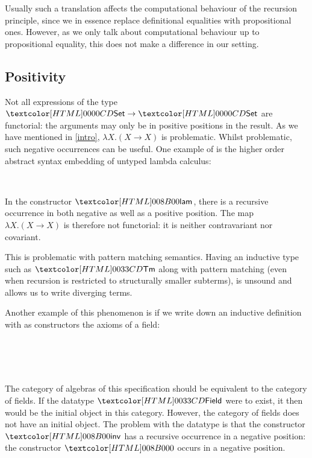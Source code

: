 Usually such a translation affects the computational behaviour of the
recursion principle, since we in essence replace definitional
equalities with propositional ones. However, as we only talk about
computational behaviour up to propositional equality, this does not
make a difference in our setting.

\subsection{Positivity}

Not all expressions of the type $\Set \to \Set$ are functorial: the
arguments may only be in positive positions in the result. As we have
mentioned in \cref{intro}, $\lambda X . (X \to X)$ is
problematic. Whilst problematic, such negative occurrences can be
useful. One example of is the higher order abstract syntax embedding
of untyped lambda calculus:
%
\begin{datatype}{\tttmty}{\Set}
  \constr{\ttapp}{\tttmty \to \tttmty \to \tttmty} \\
  \constr{\ttlam}{(\tttmty \to \tttmty) \to \tttmty}
\end{datatype}
%
In the constructor $\ttlam$, there is a recursive occurrence in both
negative as well as a positive position. The map
$\lambda X . (X \to X)$ is therefore not functorial: it is neither
contravariant nor covariant. 

This is problematic with pattern matching semantics. Having an
inductive type such as $\tttmty$ along with pattern matching (even
when recursion is restricted to structurally smaller subterms), is
unsound and allows us to write diverging terms.

Another example of this phenomenon is if we write down an inductive
definition with as constructors the axioms of a field:
%
\begin{datatype}{\fieldty}{\Set}
  \constr{\fieldzero}{\fieldty} \\
  \constrdots \\
   \\
  \constrdots
\end{datatype}
%
The category of algebras of this specification should be equivalent to
the category of fields. If the datatype $\fieldty$ were to exist, it
then would be the initial object in this category. However, the
category of fields does not have an initial object. The problem with
the datatype is that the constructor $\fieldinv$ has a recursive
occurrence in a negative position: the constructor $\fieldzero$ occurs
in a negative position.

